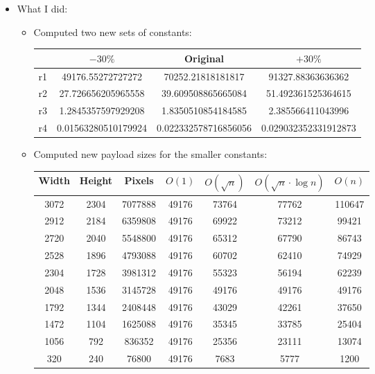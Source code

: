 \documentclass[11pt,a4paper]{report}
\begin{document}
\begin{itemize}

  \item What I did:
    \begin{itemize}
      \item Computed two new sets of constants:
      \begin{center}
        \begin{tabular}{ c | c c c }
        & $-30\%$ & Original & $+30\%$ \\ \hline
        r1 & 49176.55272727272 & 70252.21818181817 & 91327.88363636362 \\
        r2 & 27.726656205965558 & 39.609508865665084 & 51.492361525364615 \\
        r3 & 1.2845357597929208 & 1.8350510854184585 & 2.385566411043996 \\
        r4 & 0.01563280510179924 & 0.022332578716856056 & 0.029032352331912873 \\
        \end{tabular}
      \end{center}
      
      \item Computed new payload sizes for the smaller constants:
      \begin{center}
        \begin{tabular}{ c c c | c c c c }
        Width & Height & Pixels & $O(1)$ & $O(\sqrt{n})$ & $O(\sqrt{n} \cdot \log n)$ & $O(n)$ \\ \hline
        3072 & 2304 & 7077888 & 49176 & 73764 & 77762 & 110647 \\
        2912 & 2184 & 6359808 & 49176 & 69922 & 73212 & 99421 \\
        2720 & 2040 & 5548800 & 49176 & 65312 & 67790 & 86743 \\
        2528 & 1896 & 4793088 & 49176 & 60702 & 62410 & 74929 \\
        2304 & 1728 & 3981312 & 49176 & 55323 & 56194 & 62239 \\
        2048 & 1536 & 3145728 & 49176 & 49176 & 49176 & 49176 \\
        1792 & 1344 & 2408448 & 49176 & 43029 & 42261 & 37650 \\
        1472 & 1104 & 1625088 & 49176 & 35345 & 33785 & 25404 \\
        1056 & 792 & 836352 & 49176 & 25356 & 23111 & 13074 \\
        320 & 240 & 76800 & 49176 & 7683 & 5777 & 1200 \\
        \end{tabular}
      \end{center}
      

\end{itemize}
\end{itemize}
\end{document}
